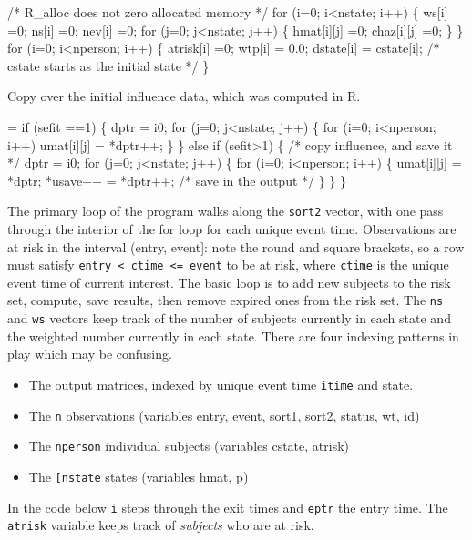 \documentclass{article}
\newcommand{\code}[1]{\texttt{#1}}
\begin{document}
\begin{nwchunk}
 /* R_alloc does not zero allocated memory */
 for (i=0; i<nstate; i++) \{
     ws[i] =0;
     ns[i] =0;
     nev[i] =0;
     for (j=0; j<nstate; j++) \{
             hmat[i][j] =0;
             chaz[i][j] =0;
     \}
 \}
 for (i=0; i<nperson; i++) \{
     atrisk[i] =0;
     wtp[i] = 0.0;
     dstate[i] = cstate[i];  /* cstate starts as the initial state */
 \}
\end{nwchunk}

Copy over the initial influence data, which was computed in R.
\begin{nwchunk}
=
 if (sefit ==1) \{
     dptr = i0;
     for (j=0; j<nstate; j++) \{
         for (i=0; i<nperson; i++) umat[i][j] = *dptr++;
     \}
  \}
  else if (sefit>1) \{
      /* copy influence, and save it */
      dptr = i0;
      for (j=0; j<nstate; j++) \{
          for (i=0; i<nperson; i++) \{
              umat[i][j] = *dptr;
              *usave++ = *dptr++;   /* save in the output */
          \}
      \}
 \} 
\end{nwchunk}

The primary loop of the program walks along the \code{sort2}
vector, with one pass through the interior of the for loop for each unique
event time.  
Observations are at risk in the interval (entry, event]: note
the round and square brackets, so a row must satisfy 
\code{entry < ctime <= event} to be at risk, 
where \code{ctime} is the unique event time of current interest.
The basic loop is to add new subjects to the risk set, compute,
save results, then remove expired ones from the risk set.
The \code{ns} and \code{ws} vectors keep track of the number of subjects
currently in each state and the weighted number currently in each
state.  
There are four indexing patterns in play which may be confusing.
\begin{itemize}
  \item The output matrices, indexed by unique event time \code{itime}
    and state.
  \item The \code{n} observations (variables entry, event, sort1, sort2, status,
    wt, id)
  \item The \code{nperson} individual subjects (variables cstate, atrisk)
  \item The \code{[nstate} states (variables hmat, p)
\end{itemize}

In the code below \code{i} steps through the exit times and \code{eptr} the
entry time.  The \code{atrisk} variable keeps track of \emph{subjects} who are
at risk.  
\end{document}
